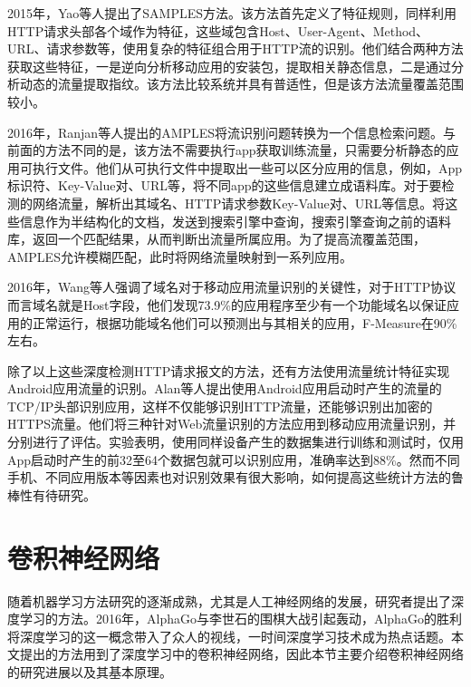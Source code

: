 2015年，Yao等人提出了SAMPLES方法\supercite{yao2015samples}。该方法首先定义了特征规则，同样利用HTTP请求头部各个域作为特征，这些域包含Host、User-Agent、Method、URL、请求参数等，使用复杂的特征组合用于HTTP流的识别。他们结合两种方法获取这些特征，一是逆向分析移动应用的安装包，提取相关静态信息，二是通过分析动态的流量提取指纹。该方法比较系统并具有普适性，但是该方法流量覆盖范围较小。

2016年，Ranjan等人提出的AMPLES将流识别问题转换为一个信息检索问题\supercite{ranjan2016approximate}。与前面的方法不同的是，该方法不需要执行app获取训练流量，只需要分析静态的应用可执行文件。他们从可执行文件中提取出一些可以区分应用的信息，例如，App标识符、Key-Value对、URL等，将不同app的这些信息建立成语料库。对于要检测的网络流量，解析出其域名、HTTP请求参数Key-Value对、URL等信息。将这些信息作为半结构化的文档，发送到搜索引擎中查询，搜索引擎查询之前的语料库，返回一个匹配结果，从而判断出流量所属应用。为了提高流覆盖范围，AMPLES允许模糊匹配，此时将网络流量映射到一系列应用。

2016年，Wang等人强调了域名对于移动应用流量识别的关键性\supercite{wang2016whatapp}，对于HTTP协议而言域名就是Host字段，他们发现73.9\%的应用程序至少有一个功能域名以保证应用的正常运行，根据功能域名他们可以预测出与其相关的应用，F-Measure在90\%左右。

除了以上这些深度检测HTTP请求报文的方法，还有方法使用流量统计特征实现Android应用流量的识别。Alan等人提出使用Android应用启动时产生的流量的TCP/IP头部识别应用，这样不仅能够识别HTTP流量，还能够识别出加密的HTTPS流量\supercite{alan2016can}。他们将三种针对Web流量识别的方法\cite{sun2002statistical,liberatore2006inferring,herrmann2009website}应用到移动应用流量识别，并分别进行了评估。实验表明，使用同样设备产生的数据集进行训练和测试时，仅用App启动时产生的前32至64个数据包就可以识别应用，准确率达到88\%。然而不同手机、不同应用版本等因素也对识别效果有很大影响，如何提高这些统计方法的鲁棒性有待研究。



\section{卷积神经网络}
随着机器学习方法研究的逐渐成熟，尤其是人工神经网络的发展，研究者提出了深度学习的方法。2016年，AlphaGo与李世石的围棋大战引起轰动，AlphaGo的胜利将深度学习的这一概念带入了众人的视线，一时间深度学习技术成为热点话题。本文提出的方法用到了深度学习中的卷积神经网络，因此本节主要介绍卷积神经网络的研究进展以及其基本原理。

